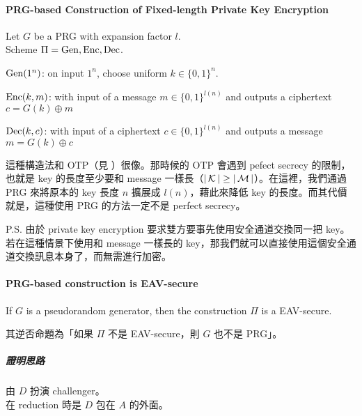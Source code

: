 \paragraph{PRG-based Construction of Fixed-length Private Key Encryption}

Let \(G\) be a PRG with expansion factor \(l\). \\
Scheme \(\Pi = \operatorname{Gen}, \operatorname{Enc}, \operatorname{Dec}\).
\begin{myItemize}
	\item \(\operatorname{Gen}(1^n)\): on input \(1^n\), choose uniform \(k \in \{0, 1\}^n\).
	\item \(\operatorname{Enc}(k, m)\): with input of a message \(m \in \{0, 1\}^{l(n)}\) and outputs a ciphertext \(c = G(k) \oplus m\)
	\item \(\operatorname{Dec}(k, c)\): with input of a ciphertext \(c \in \{0, 1\}^{l(n)}\) and outputs a message \(m = G(k) \oplus c\)
\end{myItemize}

這種構造法和 OTP（見 ）很像。那時候的 OTP 會遇到 pefect secrecy 的限制，也就是 key 的長度至少要和 message 一樣長（\(|\operatorname{\mathcal{K}}| \geq |\operatorname{\mathcal{M}}|\)）。在這裡，我們通過 PRG 來將原本的 key 長度 \(n\) 擴展成 \(l(n)\)，藉此來降低 key 的長度。而其代價就是，這種使用 PRG 的方法一定不是 perfect secrecy。

P.S. 由於 private key encryption 要求雙方要事先使用安全通道交換同一把 key。若在這種情景下使用和 message 一樣長的 key，那我們就可以直接使用這個安全通道交換訊息本身了，而無需進行加密。


\paragraph{PRG-based construction is EAV-secure}

\begin{theorem}
	If \(G\) is a pseudorandom generator, then the construction \(\Pi\) is a EAV-secure.
\end{theorem}

其逆否命題為「如果 \(\Pi\) 不是 EAV-secure，則 \(G\) 也不是 PRG」。

\subparagraph{證明思路}

由 \(D\) 扮演 challenger。 \\
在 reduction 時是 \(D\) 包在 \(A\) 的外面。

\begin{figure}
\end{figure}

